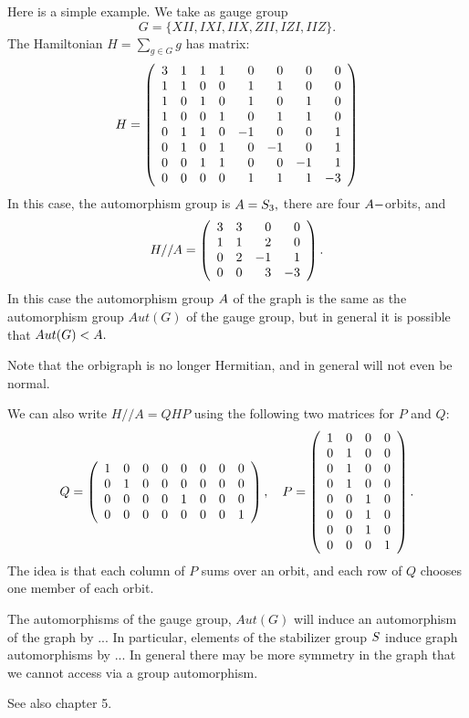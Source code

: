 Here is a simple example. %
We take as gauge group 
$$G = \{XII, IXI, IIX, ZII, IZI, IIZ\}.$$
The Hamiltonian $H = \sum_{g\in G} g$ has matrix:
$$
H = \left(\begin{array}{rrrrrrrr}
 3 &  1 &  1 &  1 &  0 &  0 &  0 &  0 \cr
  1 &  1 &  0 &  0 &  1 &  1 &  0 &  0 \cr
  1 &  0 &  1 &  0 &  1 &  0 &  1 &  0 \cr
  1 &  0 &  0 &  1 &  0 &  1 &  1 &  0 \cr
  0 &  1 &  1 &  0 & -1 &  0 &  0 &  1 \cr
  0 &  1 &  0 &  1 &  0 & -1 &  0 &  1 \cr
  0 &  0 &  1 &  1 &  0 &  0 & -1 &  1 \cr
  0 &  0 &  0 &  0 &  1 &  1 &  1 & -3
\end{array}\right)
$$
In this case, the automorphism group is $A=S_3,$
there are four $A-$orbits, and
$$
H//A = \left(\begin{array}{rrrr}
 3 &  3 &  0 &  0 \cr
  1 &  1 &  2 &  0 \cr
  0 &  2 & -1 &  1 \cr
  0 &  0 &  3 & -3
\end{array}\right).
$$
In this case the automorphism group $A$ of the graph
is the same as the automorphism group $Aut(G)$ of the gauge group,
but in general it is possible that $Aut(G) < A.$

Note that the orbigraph is no longer Hermitian,
and in general will not even be normal.

We can also write $H//A = QHP$ using the following two matrices for $P$ and $Q:$
$$
Q = 
\left(\begin{array}{rrrrrrrr}
 1 &  0 &  0 &  0 &  0 &  0 &  0 &  0 \cr
  0 &  1 &  0 &  0 &  0 &  0 &  0 &  0 \cr
  0 &  0 &  0 &  0 &  1 &  0 &  0 &  0 \cr
  0 &  0 &  0 &  0 &  0 &  0 &  0 &  1
\end{array}\right),\ \ \ 
P = 
\left(\begin{array}{rrrr}
 1 &  0 &  0 &  0 \cr
  0 &  1 &  0 &  0 \cr
  0 &  1 &  0 &  0 \cr
  0 &  1 &  0 &  0 \cr
  0 &  0 &  1 &  0 \cr
  0 &  0 &  1 &  0 \cr
  0 &  0 &  1 &  0 \cr
  0 &  0 &  0 &  1
\end{array}\right).
$$
The idea is that each column of $P$ sums over an orbit,
and each row of $Q$ chooses one member of each orbit.

The automorphisms of the gauge group, $Aut(G)$ will induce an
automorphism of the graph by ...
In particular, elements of the stabilizer group $S$ induce graph 
automorphisms by ...
In general there may be more symmetry in the graph that
we cannot access via a group automorphism.

See also \cite{Cvetkovic1980} chapter 5.

